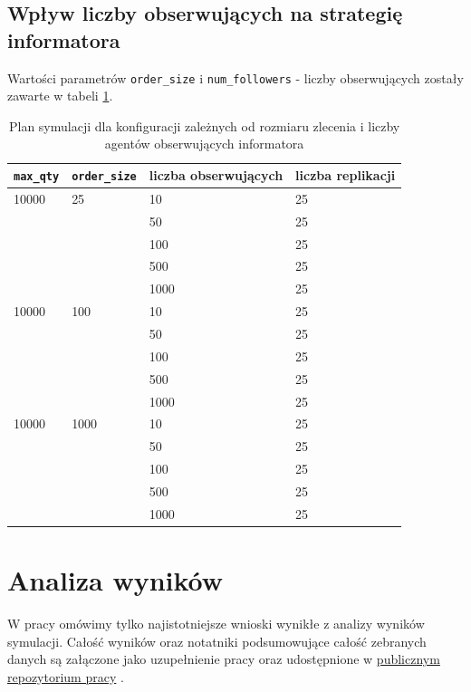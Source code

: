 \subsection{Wpływ liczby obserwujących na strategię informatora}
Wartości parametrów \texttt{order\_size} i \texttt{num\_followers} - liczby obserwujących zostały zawarte w tabeli \ref{tab:simplan2}.
\begin{table}
\caption{Plan symulacji dla konfiguracji zależnych od rozmiaru zlecenia i liczby agentów obserwujących informatora} 
\label{tab:simplan2}
\begin{center}
\begin{tabular}{|p{2cm}|p{2cm}|p{2cm}|p{2cm}|}
\hline
\textbf{\texttt{max\_qty}} & \textbf{\texttt{order\_size}} & \textbf{liczba obserwujących} & \textbf{liczba replikacji} \\
\hline 
10000 & 25 & 10 & 25 \\
& & 50& 25\\
& & 100 & 25\\
& & 500& 25\\
& &1000 & 25\\
\hline
10000 & 100 & 10 & 25 \\
& & 50& 25\\
& & 100 & 25\\
& & 500& 25\\
& &1000 & 25\\
\hline
10000 & 1000 & 10 & 25 \\
& & 50& 25\\
& & 100 & 25\\
& & 500& 25\\
& &1000 & 25\\
\hline

\end{tabular} 
\end{center}
\end{table}



\section{Analiza wyników}
W pracy omówimy tylko najistotniejsze wnioski wynikłe z analizy wyników symulacji. Całość wyników oraz notatniki podsumowujące całość zebranych danych są załączone jako uzupełnienie pracy oraz udostępnione w \href{https://github.com/AgataCieslik/abides-jpmc-public}{publicznym repozytorium pracy} .
